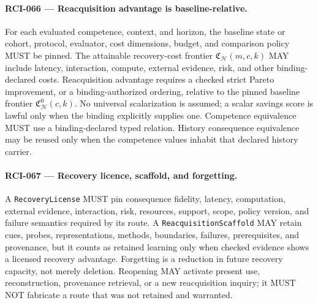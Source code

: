 \documentclass[11pt]{article}
\begin{document}
\paragraph{RCI-066 --- Reacquisition advantage is baseline-relative.}
For each evaluated competence, context, and horizon, the baseline state or
cohort, protocol, evaluator, cost dimensions, budget, and comparison policy MUST
be pinned. The attainable recovery-cost frontier
\(\mathfrak C_{\mathcal H}(m,c,k)\) MAY include latency, interaction, compute,
external evidence, risk, and other binding-declared costs. Reacquisition
advantage requires a checked strict Pareto improvement, or a binding-authorized
ordering, relative to the pinned baseline frontier
\(\mathfrak C^0_{\mathcal H}(c,k)\). No universal scalarization is assumed; a
scalar savings score is lawful only when the binding explicitly supplies one.
Competence equivalence MUST use a binding-declared typed relation. History
consequence equivalence may be reused only when the competence values inhabit
that declared history carrier.

\paragraph{RCI-067 --- Recovery licence, scaffold, and forgetting.}
A \texttt{RecoveryLicense} MUST pin consequence fidelity, latency, computation,
external evidence, interaction, risk, resources, support, scope, policy version,
and failure semantics required by its route. A
\texttt{ReacquisitionScaffold} MAY retain cues, probes, representations,
methods, boundaries, failures, prerequisites, and provenance, but it counts as
retained learning only when checked evidence shows a licensed recovery
advantage. Forgetting is a reduction in future recovery capacity, not merely
deletion. Reopening MAY activate present use, reconstruction, provenance
retrieval, or a new reacquisition inquiry; it MUST NOT fabricate a route that
was not retained and warranted.
\end{document}
